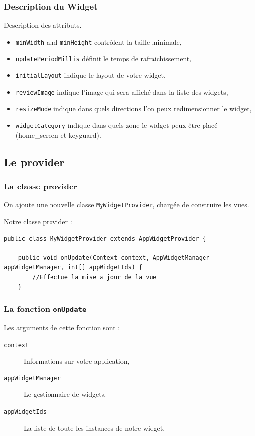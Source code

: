 \documentclass{beamer}
\begin{document}
\begin{frame}
\frametitle{Description du Widget}
\begin{block}{Description des attributs.}
\begin{itemize}
\item \verb!minWidth! and \verb!minHeight! contrôlent la taille minimale,
\item \verb!updatePeriodMillis! définit le temps de rafraichissement,
\item \verb!initialLayout! indique le layout de votre widget,
\item \verb!reviewImage! indique l'image qui sera affiché dans la liste des widgets,
\item \verb!resizeMode! indique dans quels directions l'on peux redimensionner le widget,
\item \verb!widgetCategory! indique dans quels zone le widget peux être placé (home\_screen et keyguard).
\end{itemize}
\end{block}
\end{frame}

\subsection{Le provider}

\begin{frame}[fragile]
\frametitle{La classe provider}
On ajoute une nouvelle classe \verb!MyWidgetProvider!, chargée de construire les vues.
\begin{exampleblock}{Notre classe provider :}
\lstset{language=java}
\begin{lstlisting}
public class MyWidgetProvider extends AppWidgetProvider {

    public void onUpdate(Context context, AppWidgetManager appWidgetManager, int[] appWidgetIds) {
        //Effectue la mise a jour de la vue
    }
\end{lstlisting}
\end{exampleblock}
\end{frame}




\begin{frame}[fragile]
\frametitle{La fonction \verb!onUpdate!}
\begin{block}{Les arguments de cette fonction sont :}
\begin{description}
\item[\verb!context!] Informations sur votre application,
\item[\verb!appWidgetManager!] Le gestionnaire de widgets,
\item[\verb!appWidgetIds!] La liste de toute les instances de notre widget.
\end{description}
\end{block}
\end{frame}
\end{document}
